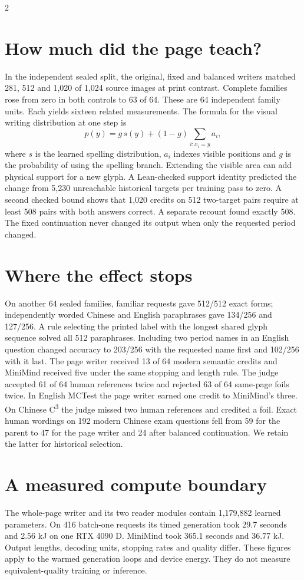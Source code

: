 \begin{multicols}{2}
\section*{How much did the page teach?}
In the independent sealed split, the original, fixed and balanced writers matched 281, 512 and 1,020 of 1,024 source images at print contrast. Complete families rose from zero in both controls to 63 of 64. These are 64 independent family units. Each yields sixteen related measurements. The formula for the visual writing distribution at one step is
\[
 p(y)=g\,s(y)+(1-g)\!\sum_{i:x_i=y}\!a_i ,
\]
where $s$ is the learned spelling distribution, $a_i$ indexes visible positions and $g$ is the probability of using the spelling branch. Extending the visible area can add physical support for a new glyph. A Lean-checked support identity predicted the change from 5,230 unreachable historical targets per training pass to zero. A second checked bound shows that 1,020 credits on 512 two-target pairs require at least 508 pairs with both answers correct. A separate recount found exactly 508. The fixed continuation never changed its output when only the requested period changed.
\section*{Where the effect stops}
On another 64 sealed families, familiar requests gave 512/512 exact forms; independently worded Chinese and English paraphrases gave 134/256 and 127/256. A rule selecting the printed label with the longest shared glyph sequence solved all 512 paraphrases. Including two period names in an English question changed accuracy to 203/256 with the requested name first and 102/256 with it last. The page writer received 13 of 64 modern semantic credits and MiniMind received five under the same stopping and length rule. The judge accepted 61 of 64 human references twice and rejected 63 of 64 same-page foils twice. In English MCTest the page writer earned one credit to MiniMind's three. On Chinese C\textsuperscript{3} the judge missed two human references and credited a foil. Exact human wordings on 192 modern Chinese exam questions fell from 59 for the parent to 47 for the page writer and 24 after balanced continuation. We retain the latter for historical selection.
\section*{A measured compute boundary}
The whole-page writer and its two reader modules contain 1,179,882 learned parameters. On 416 batch-one requests its timed generation took 29.7 seconds and 2.56 kJ on one RTX 4090 D. MiniMind took 365.1 seconds and 36.77 kJ. Output lengths, decoding units, stopping rates and quality differ. These figures apply to the warmed generation loops and device energy. They do not measure equivalent-quality training or inference.
\end{multicols}
